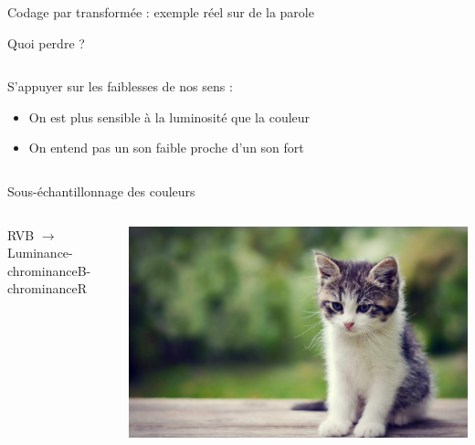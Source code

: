 \documentclass[9pt, aspectratio=169]{beamer}
\begin{document}
\begin{frame}{Codage par transformée : exemple réel sur de la parole} %



\end{frame}



\begin{frame}{Quoi perdre ?} %
\begin{columns}
   \begin{column}{0.6\textwidth}
		S'appuyer sur les faiblesses de nos sens :
  \begin{itemize}
      \item On est plus sensible à la luminosité que la couleur
      \item On entend pas un son faible proche d'un son fort
  \end{itemize}
   \end{column}
   \begin{column}{0.39\textwidth}
		
   \end{column}
\end{columns}
\end{frame}

\begin{frame}[allowframebreaks]{Sous-échantillonnage des couleurs} %
\begin{columns}
   \begin{column}{0.6\textwidth}
    RVB $\rightarrow$ Luminance-chrominanceB-chrominanceR
   \end{column}
   \begin{column}{0.39\textwidth}
		\includegraphics[width=\textwidth]{fig/cat/cat.jpg}
        
   \end{column}
\end{columns}
\framebreak
{}
\end{frame}
\end{document}

